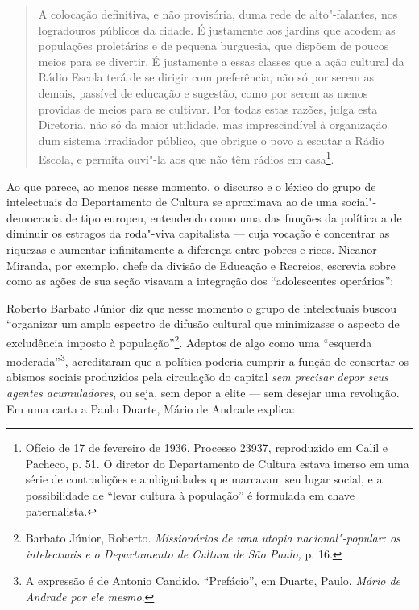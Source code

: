 \begin{quote}
A colocação definitiva, e não provisória, duma rede de alto"-falantes,
nos logradouros públicos da cidade. É justamente aos jardins que acodem
as populações proletárias e de pequena burguesia, que dispõem de poucos
meios para se divertir. É justamente a essas classes que a ação cultural
da Rádio Escola terá de se dirigir com preferência, não só por serem as
demais, passível de educação e sugestão, como por serem as menos
providas de meios para se cultivar. Por todas estas razões, julga esta
Diretoria, não só da maior utilidade, mas imprescindível à organização
dum sistema irradiador público, que obrigue o povo a escutar a Rádio
Escola, e permita ouvi"-la aos que não têm rádios em casa\footnote{Ofício
  de 17 de fevereiro de 1936, Processo 23937, reproduzido em Calil e
  Pacheco, p. 51. O diretor do Departamento de Cultura estava imerso em
  uma série de contradições e ambiguidades que marcavam seu lugar
  social, e a possibilidade de ``levar cultura à população'' é formulada
  em chave paternalista.}.
\end{quote}

Ao que parece, ao menos nesse momento, o discurso e o léxico do grupo de
intelectuais do Departamento de Cultura se aproximava ao de uma
social"-democracia de tipo europeu, entendendo como uma das funções da
política a de diminuir os estragos da roda"-viva capitalista --- cuja
vocação é concentrar as riquezas e aumentar infinitamente a diferença
entre pobres e ricos. Nicanor Miranda, por exemplo, chefe da divisão de
Educação e Recreios, escrevia sobre como as ações de sua seção visavam a
integração dos ``adolescentes operários'':

\begin{quote}
\end{quote}

Roberto Barbato Júnior diz que nesse momento o grupo de intelectuais
buscou ``organizar um amplo espectro de difusão cultural que minimizasse
o aspecto de excludência imposto à população''\footnote{Barbato Júnior,
  Roberto. \emph{Missionários de uma utopia nacional"-popular: os
  intelectuais e o Departamento de Cultura de São Paulo,} p. 16.}.
Adeptos de algo como uma ``esquerda moderada''\footnote{A expressão é de
  Antonio Candido. ``Prefácio'', em Duarte, Paulo. \emph{Mário de
  Andrade por ele mesmo}.}, acreditaram que a política poderia cumprir a
função de consertar os abismos sociais produzidos pela circulação do
capital \emph{sem precisar depor seus agentes acumuladores}, ou seja,
sem depor a elite --- sem desejar uma revolução. Em uma carta a Paulo
Duarte, Mário de Andrade explica:

